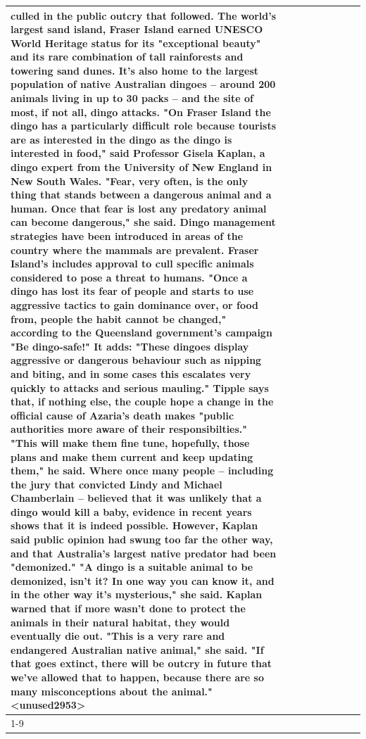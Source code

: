 \begin{table}[H]
\begin{tabular}{lllrlllll}
culled in the public outcry that followed. The world's largest sand island, Fraser Island earned UNESCO World Heritage status for its "exceptional beauty" and its rare combination of tall rainforests and towering sand dunes. It's also home to the largest population of native Australian dingoes -- around 200 animals living in up to 30 packs -- and the site of most, if not all, dingo attacks. "On Fraser Island the dingo has a particularly difficult role because tourists are as interested in the dingo as the dingo is interested in food," said Professor Gisela Kaplan, a dingo expert from the University of New England in New South Wales. "Fear, very often, is the only thing that stands between a dangerous animal and a human. Once that fear is lost any predatory animal can become dangerous," she said. Dingo management strategies have been introduced in areas of the country where the mammals are prevalent. Fraser Island's includes approval to cull specific animals considered to pose a threat to humans. "Once a dingo has lost its fear of people and starts to use aggressive tactics to gain dominance over, or food from, people the habit cannot be changed," according to the Queensland government's campaign "Be dingo-safe!" It adds: "These dingoes display aggressive or dangerous behaviour such as nipping and biting, and in some cases this escalates very quickly to attacks and serious mauling." Tipple says that, if nothing else, the couple hope a change in the official cause of Azaria's death makes "public authorities more aware of their responsibilties." "This will make them fine tune, hopefully, those plans and make them current and keep updating them," he said. Where once many people -- including the jury that convicted Lindy and Michael Chamberlain -- believed that it was unlikely that a dingo would kill a baby, evidence in recent years shows that it is indeed possible. However, Kaplan said public opinion had swung too far the other way, and that Australia's largest native predator had been "demonized." "A dingo is a suitable animal to be demonized, isn't it? In one way you can know it, and in the other way it's mysterious," she said. Kaplan warned that if more wasn't done to protect the animals in their natural habitat, they would eventually die out. "This is a very rare and endangered Australian native animal," she said. "If that goes extinct, there will be outcry in future that we've allowed that to happen, because there are so many misconceptions about the animal."<unused2953> \\
\cline{1-9}

\end{tabular}
\end{table}

